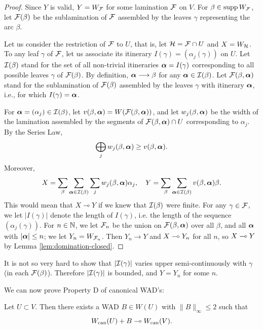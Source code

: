 \begin{proof}
Since $Y$ is valid,   $Y=W_{\mathcal F}$ for some  lamination ${\mathcal F}$ on $V$.
For $\beta\in \operatorname{supp} W_{\mathcal F}$,
let ${\mathcal F}(\beta)$ be the sublamination of ${\mathcal F}$ assembled by the leaves $\gamma$
representing the arc $\beta$.

Let us consider the restriction of ${\mathcal F}$ to $U$, that is, let ${\mathcal H} = {\mathcal F}\cap U$ and $X=W_{\mathcal H}$.
To any leaf $\gamma$ of ${\mathcal F}$, let us associate its itinerary $I(\gamma)=(\alpha_j(\gamma))$
on $U$.
Let ${\mathcal I}(\beta)$ stand for the set of all non-trivial itineraries $\boldsymbol{\alpha} = I(\gamma)$
corresponding to all possible leaves $\gamma$ of ${\mathcal F}(\beta)$.
By definition, $ \boldsymbol{\alpha} \longrightarrow \beta$ for any $ \boldsymbol{\alpha}\in {\mathcal I}(\beta)$.
Let ${\mathcal F}(\beta, \boldsymbol{\alpha})$ stand for the sublamination of ${\mathcal F}(\beta)$ assembled by the leaves $\gamma$
with itinerary $\boldsymbol{\alpha}$, i.e., for which $I(\gamma) = \boldsymbol{\alpha}$.

For $\boldsymbol{\alpha}=(\alpha_j)\in {\mathcal I}(\beta)$,
let $v(\beta,\boldsymbol{\alpha}) =  W({\mathcal F}(\beta,\boldsymbol{\alpha}))$, and
let $w_j (\beta, \boldsymbol{\alpha})$ be the width of the lamination assembled by the segments
of ${\mathcal F}(\beta, \boldsymbol{\alpha}) \cap U$ corresponding to $\alpha_j$.
By the Series Law,
$$
   \bigoplus_j w_j (\beta, \boldsymbol{\alpha})  \geq  v(\beta, \boldsymbol{\alpha}).
$$
  Moreover,
$$
     X =  \sum_\beta \sum_{\boldsymbol{\alpha}\in {\mathcal I}(\beta)} \sum_j  w_j(\beta, \boldsymbol{\alpha}) \alpha_j, \quad
     Y = \sum_{\beta} \sum_{\boldsymbol{\alpha}\in {\mathcal I}(\beta)} v (\beta, \boldsymbol{\alpha}) \beta.
$$
This would mean that  $X\multimap Y$ if we knew that ${\mathcal I}(\beta)$ were finite. 
For any $\gamma \in {\mathcal F}$, 
we let $| I(\gamma) |$ denote the length of $I(\gamma)$, i.e. the length of the sequence $(\alpha_j(\gamma))$. 
For $n \in {\Bbb N}$, we let ${\mathcal F}_n$ be the union on ${\mathcal F}(\beta, \boldsymbol{\alpha})$ over all $\beta$, and all $\boldsymbol{\alpha}$ with $|\boldsymbol{\alpha}| \le n$;
we let $Y_n = W_{{\mathcal F}_n}$. 
Then $Y_n \to Y$ and $X \multimap Y_n$ for all $n$, so $X \multimap Y$ by Lemma \ref{lem:domination-closed}.
\end{proof}

\begin{rem}
It is not so very hard to show that $|{\mathcal I}(\gamma)|$ varies upper semi-continuously with $\gamma$ (in each ${\mathcal F}(\beta)$).
Therefore $|{\mathcal I}(\gamma)|$ is bounded, and $Y = Y_n$ for some $n$. 
\end{rem}

We can now prove Property D of canonical WAD's:

\begin{lem}\label{B}
  Let $U\subset V$. Then there exists a WAD $B\in W(U)$ with $\|B\|_\infty\leq 2$ such that
$$
  W_{\mathrm{can}}(U) + B \multimap W_{\mathrm{can}}(V).
$$
\end{lem}

